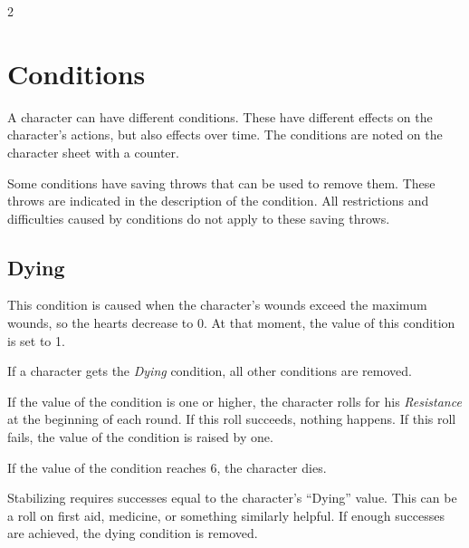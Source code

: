 \begin{multicols}{2}

\section{Conditions}

A character can have different conditions. These have different effects on the character's actions, but also effects over time. The conditions are noted on the character sheet with a counter.

Some conditions have saving throws that can be used to remove them. These throws are indicated in the description of the condition. All restrictions and difficulties caused by conditions do not apply to these saving throws.

\subsection{Dying}

This condition is caused when the character's wounds exceed the maximum wounds, so the hearts decrease to 0. At that moment, the value of this condition is set to 1.

If a character gets the \textit{Dying} condition, all other conditions are removed.

If the value of the condition is one or higher, the character rolls for his \textit{Resistance} at the beginning of each round. If this roll succeeds, nothing happens. If this roll fails, the value of the condition is raised by one.

If the value of the condition reaches 6, the character dies.

Stabilizing requires successes equal to the character's ``Dying'' value. This can be a roll on first aid, medicine, or something similarly helpful. If enough successes are achieved, the dying condition is removed.


\end{multicols}
